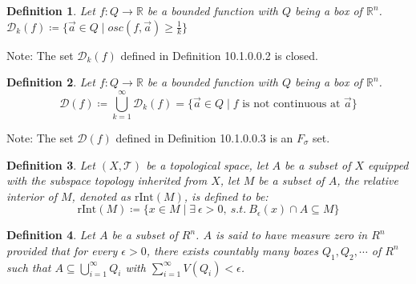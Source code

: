 \documentclass[11pt,oneside]{book}
\theoremstyle{break}
\theoremstyle{break}
\newtheorem{defn}{Definition}[corL]
\newcommand{\R}{\mathbb{R}}
\newcommand{\D}{\mathcal{D}}
\newcommand{\T}{\mathcal{T}}
\newcommand{\note}{\color{red}Note: \color{black}}
\begin{document}
\begin{defn}
Let $f:Q \to \R$ be a bounded function with $Q$ being a box of $\R^n$. $\D_k(f)\coloneqq \{ \vec{a} \in Q \mid osc(f,\vec{a}) \geq \frac{1}{k}\}$
\end{defn}
 
\note The set $\D_k(f)$ defined in Definition 10.1.0.0.2 is closed.

\begin{defn}
Let $f:Q \to \R$ be a bounded function with $Q$ being a box of $\R^n$. $$\D(f) \coloneqq \bigcup_{k=1}^\infty \D_k(f) = \{\vec{a}\in Q \mid f \text{ is not continuous at } \vec{a}\}$$
\end{defn}
\note The set $\D(f)$ defined in Definition 10.1.0.0.3 is an $F_\sigma$ set.

\begin{defn}
Let $(X,\T)$ be a topological space, let $A$ be a subset of $X$ equipped with the subspace topology inherited from $X$, let $M$ be a subset of $A$, the relative interior of $M$, denoted as $\text{rInt}(M)$, is defined to be: $$\text{rInt}(M) \coloneqq \{x\in M \mid \exists\ \epsilon >0,\ s.t.\  B_\epsilon(x)\cap A \subseteq M \}$$
\end{defn}

\begin{defn}
Let $A$ be a subset of $R^n$. $A$ is said to have measure zero in 
$R^n$ provided that for every $\epsilon > 0$, there exists countably many boxes $Q_1,Q_2,\cdots$ of $R^n$ such that $A \subseteq \bigcup_{i=1}^\infty Q_i$ with $\sum_{i=1}^\infty V(Q_i)< \epsilon$. 
\end{defn}
\end{document}
